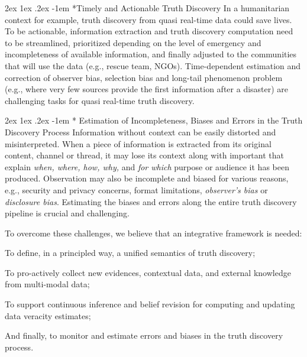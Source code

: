\documentclass[prodmode,acmtecs]{acmsmall} %
\makeatletter
\renewcommand\paragraph{\@startsection{paragraph}{5}{\z@}%
                                       {2ex \@plus1ex \@minus .2ex}%
                                       {-1em}%
                                      {\sffamily\normalsize\bfseries}}
\makeatother
\begin{document}
\paragraph*{Timely and Actionable Truth Discovery} 
In a humanitarian context for example, truth discovery from quasi real-time data could save lives. To be actionable, information extraction and 
truth discovery computation need to be streamlined, prioritized depending on the level of emergency and incompleteness of available information,
and finally adjusted to the communities that will 
use the data (e.g., rescue team, NGOs). Time-dependent estimation and correction of observer bias, selection bias and long-tail phenomenon problem
(e.g., where very few sources provide the first information after a disaster) are challenging tasks for quasi real-time truth discovery.
\vspace*{-0.23cm}

\paragraph*{ Estimation of Incompleteness, Biases and Errors in the Truth Discovery Process}  
Information without context can be easily distorted and misinterpreted.
When a piece of information is extracted from its original 
content, channel or thread, it may lose its context along with important 
 that explain \emph{when, where, how, why,} and
\emph{for which} purpose or audience it has been produced. Observation may also be incomplete and biased for various 
reasons, e.g., security and privacy concerns, format limitations, \emph{observer's bias} or \emph{disclosure bias}. 
Estimating the biases and errors along the entire truth discovery pipeline is crucial and challenging.
%

To overcome these challenges, we believe that an integrative framework is needed:
\begin{inparaenum}[(i)]
\item To define, in a principled way, a unified semantics of truth discovery;
\item To pro-actively collect new evidences, contextual data, and external knowledge from multi-modal data; 
\item To support continuous inference and belief revision for computing and updating data veracity estimates;
\item And finally, to monitor and estimate errors and biases in the truth discovery process.
\end{inparaenum}
\end{document}
